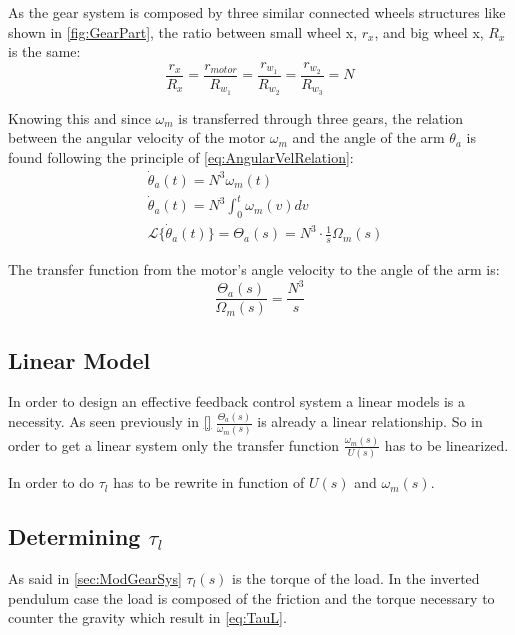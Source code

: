 As the gear system is composed by three similar connected wheels structures like shown in \autoref{fig:GearPart}, the ratio between small wheel x, $r_x$, and big wheel x, $R_x$ is the same:
\begin{equation}
	\frac{r_x}{R_x} = \frac{r_{motor}}{R_{w_1}} = \frac{r_{w_1}}{R_{w_2}} = \frac{r_{w_2}}{R_{w_3}} = N
\end{equation}

Knowing this and since $\omega_m$ is transferred through three gears, the relation between the angular velocity of the motor $\omega_m$ and the angle of the arm $\theta_a$ is found following the principle of \autoref{eq:AngularVelRelation}:
\begin{subequations} \label{eq:tech_ToA}
	\begin{flalign}
		&\dot{\theta}_a(t) = N^3 \omega_m(t) \\
		&\dot{\theta}_a(t) = N^3 \int_{0}^{t}\omega_m(v) dv \\
		&\mathscr{L}\{\dot{\theta}_a(t)\} = \Theta_a(s) = N^3 \cdot \frac{1}{s} \Omega_m(s)
	\end{flalign}
\end{subequations}

The transfer function from the motor's angle velocity to the angle of the arm is:
\begin{equation}
	\frac{\Theta_a(s)}{\Omega_m(s)} =  \frac{N^3}{s}
\end{equation}

\subsection{Linear Model}

In order to design an effective feedback control system a linear models is a necessity. As seen previously in \autoref{}  $\frac{\Theta_a(s)}{\omega_m(s)}$ is already a linear relationship. So in order to get a linear system only the transfer function $\frac{\omega_m(s)}{U(s)}$ has to be linearized.

In order to do $\tau_l$ has to be rewrite in function of $U(s)$ and $\omega_m(s)$.

\subsection{Determining $\tau_l$}
As said in \autoref{sec:ModGearSys} $\tau_l(s)$ is the torque of the load. In the inverted pendulum case the load is composed of the friction and the torque necessary to counter the gravity which result in \autoref{eq:TauL}.

